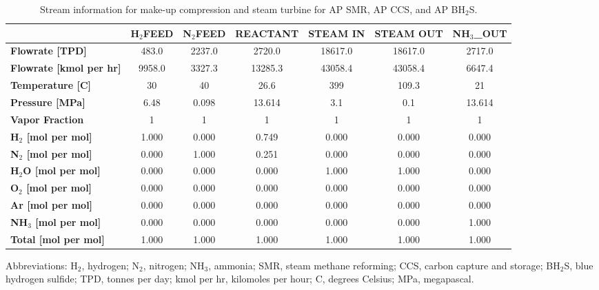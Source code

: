 \documentclass{article}
\begin{document}
\begin{table}[H]
  \centering
  \caption{Stream information for make-up compression and steam turbine for AP SMR, AP CCS, and AP BH$_2$S.}
  \label{table:si_technical4_stream_information}
  \begin{threeparttable}
    \begin{tabular}{@{}lcccccc@{}}
      \toprule
      & \textbf{H$_2$FEED} & \textbf{N$_2$FEED} & \textbf{REACTANT} & \textbf{STEAM IN} & \textbf{STEAM OUT} & \textbf{NH$_3$_OUT} \\ \midrule
      \textbf{Flowrate [TPD]} & 483.0 & 2237.0 & 2720.0 & 18617.0 & 18617.0 & 2717.0 \\
      \textbf{Flowrate [kmol per hr]} & 9958.0 & 3327.3 & 13285.3 & 43058.4 & 43058.4 & 6647.4 \\
      \textbf{Temperature [C]} & 30 & 40 & 26.6 & 399 & 109.3 & 21 \\
      \textbf{Pressure [MPa]} & 6.48 & 0.098 & 13.614 & 3.1 & 0.1 & 13.614 \\
      \textbf{Vapor Fraction} & 1 & 1 & 1 & 1 & 1 & 1 \\
      \textbf{H$_2$ [mol per mol]} & 1.000 & 0.000 & 0.749 & 0.000 & 0.000 & 0.000 \\
      \textbf{N$_2$ [mol per mol]} & 0.000 & 1.000 & 0.251 & 0.000 & 0.000 & 0.000 \\
      \textbf{H$_2$O [mol per mol]} & 0.000 & 0.000 & 0.000 & 1.000 & 1.000 & 0.000 \\
      \textbf{O$_2$ [mol per mol]} & 0.000 & 0.000 & 0.000 & 0.000 & 0.000 & 0.000 \\
      \textbf{Ar [mol per mol]} & 0.000 & 0.000 & 0.000 & 0.000 & 0.000 & 0.000 \\
      \textbf{NH$_3$ [mol per mol]} & 0.000 & 0.000 & 0.000 & 0.000 & 0.000 & 1.000 \\
      \textbf{Total [mol per mol]} & 1.000 & 1.000 & 1.000 & 1.000 & 1.000 & 1.000 \\ \bottomrule
    \end{tabular}
    \begin{tablenotes}
      \small
      \item Abbreviations: H$_2$, hydrogen; N$_2$, nitrogen; NH$_3$, ammonia; SMR, steam methane reforming; CCS, carbon capture and storage; BH$_2$S, blue hydrogen sulfide; TPD, tonnes per day; kmol per hr, kilomoles per hour; C, degrees Celsius; MPa, megapascal.
    \end{tablenotes}
  \end{threeparttable}
\end{table}
\end{document}
